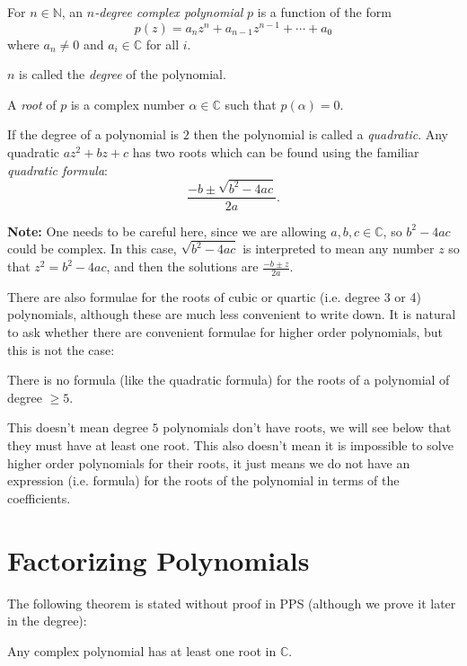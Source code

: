 \documentclass[11pt,dvipsnames]{book}
\numberwithin{equation}{section} %
\numberwithin{figure}{section} %
\numberwithin{table}{section} %
\begin{document}
\begin{definition}
For $n\in\mathbb{N}$, an {\it $n$-degree complex polynomial} \(p\) is a function of the form 
\begin{equation}
\label{e:pz}
p(z)=a_nz^n + a_{n-1}z^{n-1} + \cdots + a_0
\end{equation}
where $a_n \neq 0$ and $a_i \in \mathbb{C}$ for all $i$. 

\(n\) is called the {\em degree} of the polynomial.

A {\it root} of $p$ is a complex number  $\alpha\in\mathbb{C}$ such that $p(\alpha)=0$.
\end{definition}

If the degree of a polynomial is \(2\) then the polynomial is called a {\em quadratic}.   Any quadratic $az^2+bz+c$ has two roots which can be found using the familiar {\it quadratic formula}:
\[\frac{-b\pm \sqrt{b^2-4ac}}{2a}.\]

{\bf Note:} One needs to be careful here, since we are allowing $a,b,c\in\mathbb{C}$, so  $b^2-4ac$ could be complex. In this case, $\sqrt{b^2-4ac}$ is interpreted to mean any number $z$ so that $z^2=b^2-4ac$, and then the solutions are $\frac{-b\pm z}{2a}$.

There are also formulae for the roots of cubic or quartic (i.e. degree 3 or 4) polynomials, although these are much less convenient to write down. It is natural to ask whether there are convenient formulae for higher order polynomials, but this is not the case:


\begin{theorem} There is no formula (like the quadratic formula) for the roots of a polynomial of degree $\geq 5$.
\end{theorem}

This doesn't mean degree $5$ polynomials don't have roots, we will see below that they must have at least one root. This also doesn't mean it is impossible to solve higher order polynomials for their roots, it just means we do not have an expression (i.e. formula) for the roots of the polynomial in terms of the coefficients.


\section{Factorizing Polynomials}

The following theorem is stated without proof in PPS (although we prove it later in the degree):

\begin{theorem}
Any complex polynomial has at least one root in $\mathbb{C}$.
\end{theorem}
\end{document}
